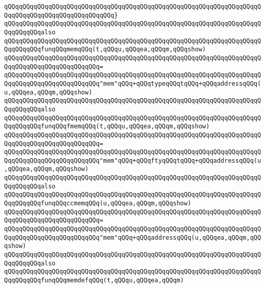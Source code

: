 \verb|qQQqqQQqqQQqqQQqqQQqqQQqqQQqqQQqqQQqqQQqqQQqqQQqqQQqqQQqqQQqqQQqqQQqqQQqqQQqqQQqqQQqqQQqqQQqqQQqqQQq}|\newline
\newline
\verb|qQQqqQQqqQQqqQQqqQQqqQQqqQQqqQQqqQQqqQQqqQQqqQQqqQQqqQQqqQQqqQQqqQQqqQQqqQQqqQQqalso|\newline
\verb|qQQqqQQqqQQqqQQqqQQqqQQqqQQqqQQqqQQqqQQqqQQqqQQqqQQqqQQqqQQqqQQqqQQqqQQqqQQqqQQqfunqQQqmemqQQq(t,qQQqu,qQQqea,qQQqm,qQQqshow)|\newline
\verb|qQQqqQQqqQQqqQQqqQQqqQQqqQQqqQQqqQQqqQQqqQQqqQQqqQQqqQQqqQQqqQQqqQQqqQQqqQQqqQQqqQQqqQQqqQQqqQQq=|\newline
\verb|qQQqqQQqqQQqqQQqqQQqqQQqqQQqqQQqqQQqqQQqqQQqqQQqqQQqqQQqqQQqqQQqqQQqqQQqqQQqqQQqqQQqqQQqqQQqqQQq"mem"qQQq+qQQqtypeqQQqtqQQq+qQQqaddressqQQq(u,qQQqea,qQQqm,qQQqshow)|\newline
\newline
\verb|qQQqqQQqqQQqqQQqqQQqqQQqqQQqqQQqqQQqqQQqqQQqqQQqqQQqqQQqqQQqqQQqqQQqqQQqqQQqqQQqalso|\newline
\verb|qQQqqQQqqQQqqQQqqQQqqQQqqQQqqQQqqQQqqQQqqQQqqQQqqQQqqQQqqQQqqQQqqQQqqQQqqQQqqQQqfunqQQqfmemqQQq(t,qQQqu,qQQqea,qQQqm,qQQqshow)|\newline
\verb|qQQqqQQqqQQqqQQqqQQqqQQqqQQqqQQqqQQqqQQqqQQqqQQqqQQqqQQqqQQqqQQqqQQqqQQqqQQqqQQqqQQqqQQqqQQqqQQq=|\newline
\verb|qQQqqQQqqQQqqQQqqQQqqQQqqQQqqQQqqQQqqQQqqQQqqQQqqQQqqQQqqQQqqQQqqQQqqQQqqQQqqQQqqQQqqQQqqQQqqQQq"mem"qQQq+qQQqftyqQQqtqQQq+qQQqaddressqQQq(u,qQQqea,qQQqm,qQQqshow)|\newline
\newline
\verb|qQQqqQQqqQQqqQQqqQQqqQQqqQQqqQQqqQQqqQQqqQQqqQQqqQQqqQQqqQQqqQQqqQQqqQQqqQQqqQQqalso|\newline
\verb|qQQqqQQqqQQqqQQqqQQqqQQqqQQqqQQqqQQqqQQqqQQqqQQqqQQqqQQqqQQqqQQqqQQqqQQqqQQqqQQqfunqQQqccmemqQQq(u,qQQqea,qQQqm,qQQqshow)|\newline
\verb|qQQqqQQqqQQqqQQqqQQqqQQqqQQqqQQqqQQqqQQqqQQqqQQqqQQqqQQqqQQqqQQqqQQqqQQqqQQqqQQqqQQqqQQqqQQqqQQq=|\newline
\verb|qQQqqQQqqQQqqQQqqQQqqQQqqQQqqQQqqQQqqQQqqQQqqQQqqQQqqQQqqQQqqQQqqQQqqQQqqQQqqQQqqQQqqQQqqQQqqQQq"mem"qQQq+qQQqaddressqQQq(u,qQQqea,qQQqm,qQQqshow)|\newline
\newline
\verb|qQQqqQQqqQQqqQQqqQQqqQQqqQQqqQQqqQQqqQQqqQQqqQQqqQQqqQQqqQQqqQQqqQQqqQQqqQQqqQQqalso|\newline
\verb|qQQqqQQqqQQqqQQqqQQqqQQqqQQqqQQqqQQqqQQqqQQqqQQqqQQqqQQqqQQqqQQqqQQqqQQqqQQqqQQqfunqQQqmemdefqQQq(t,qQQqu,qQQqea,qQQqm)|\newline
